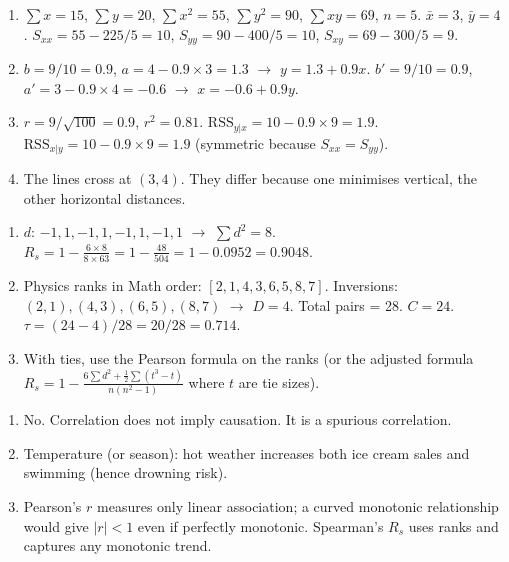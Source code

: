 \documentclass[11pt]{article}
\begin{document}
\begin{corrige}[Exercise 1]
\begin{enumerate}
    \item $\sum x = 15$, $\sum y = 20$, $\sum x^2 = 55$, $\sum y^2 = 90$, $\sum xy = 69$, $n=5$.
    $\bar{x}=3$, $\bar{y}=4$.
    $S_{xx} = 55 - 225/5 = 10$, $S_{yy} = 90 - 400/5 = 10$, $S_{xy} = 69 - 300/5 = 9$.
    \item $b = 9/10 = 0.9$, $a = 4 - 0.9\times3 = 1.3$ $\to$ $y = 1.3 + 0.9x$.
    $b' = 9/10 = 0.9$, $a' = 3 - 0.9\times4 = -0.6$ $\to$ $x = -0.6 + 0.9y$.
    \item $r = 9/\sqrt{100} = 0.9$, $r^2 = 0.81$.
    $\text{RSS}_{y|x} = 10 - 0.9\times9 = 1.9$.
    $\text{RSS}_{x|y} = 10 - 0.9\times9 = 1.9$ (symmetric because $S_{xx}=S_{yy}$).
    \item The lines cross at $(3,4)$. They differ because one minimises vertical, the other horizontal distances.
\end{enumerate}
\end{corrige}

\begin{corrige}[Exercise 2]
\begin{enumerate}
    \item $d$: $-1, 1, -1, 1, -1, 1, -1, 1$ $\to$ $\sum d^2 = 8$.
    $R_s = 1 - \frac{6\times8}{8\times63} = 1 - \frac{48}{504} = 1 - 0.0952 = 0.9048$.
    \item Physics ranks in Math order: $[2,1,4,3,6,5,8,7]$. Inversions: $(2,1), (4,3), (6,5), (8,7)$ $\to$ $D=4$. Total pairs = 28. $C=24$. $\tau = (24-4)/28 = 20/28 = 0.714$.
    \item With ties, use the Pearson formula on the ranks (or the adjusted formula $R_s = 1 - \frac{6\sum d^2 + \frac{1}{2}\sum(t^3-t)}{n(n^2-1)}$ where $t$ are tie sizes).
\end{enumerate}
\end{corrige}

\begin{corrige}[Exercise 3]
\begin{enumerate}
    \item No. Correlation does not imply causation. It is a spurious correlation.
    \item Temperature (or season): hot weather increases both ice cream sales and swimming (hence drowning risk).
    \item Pearson's $r$ measures only linear association; a curved monotonic relationship would give $|r| < 1$ even if perfectly monotonic. Spearman's $R_s$ uses ranks and captures any monotonic trend.
\end{enumerate}
\end{corrige}
\end{document}

